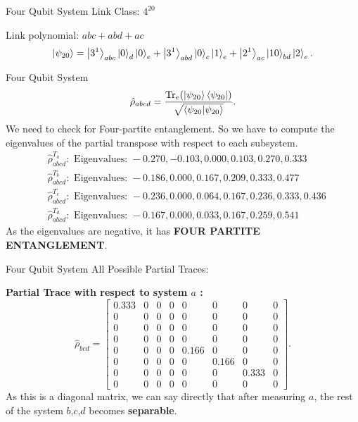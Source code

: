 \documentclass{beamer}
\begin{document}
	
\begin{frame}{Four Qubit System}
Link Class: $4^{20}$

Link polynomial: $abc+ abd + ac$
\begin{equation*}
	\ket{\psi_{20}} = \ket{3^1}_{abc}\ket{0}_{d} \ket{0}_e + \ket{3^1}_{abd} \ket{0}_c \ket{1}_e + \ket{2^1}_{ac} \ket{10}_{bd} \ket{2}_e.
\end{equation*}
\end{frame}

\begin{frame}{Four Qubit System}
\begin{equation*}
	\hat{\rho}_{abcd} = \frac{\Tr_e(\ket{\psi_{20}} \bra{\psi_{20}})}{\sqrt{\bra{\psi_{20}} \ket{\psi_{20}}}}.
\end{equation*}
We need to check for Four-partite entanglement. So we have to compute the eigenvalues of the partial transpose with respect to each subsystem.
\begin{equation*}
\begin{split}
	&\hat{\rho}^{T_a}_{abcd} : \text{ Eigenvalues: } -0.270, -0.103, 0.000, 0.103, 0.270, 0.333 \\
	&\hat{\rho}^{T_b}_{abcd}: \text{ Eigenvalues: } -0.186, 0.000, 0.167, 0.209, 0.333, 0.477 \\
	&\hat{\rho}^{T_c}_{abcd}: \text{ Eigenvalues: } -0.236, 0.000, 0.064, 0.167, 0.236, 0.333, 0.436 \\
	&\hat{\rho}^{T_d}_{abcd}: \text{ Eigenvalues: } -0.167, 0.000, 0.033, 0.167, 0.259, 0.541
\end{split}
\end{equation*}
{As the eigenvalues are negative, it has \textbf{FOUR PARTITE ENTANGLEMENT}.}
\end{frame}

\begin{frame}{Four Qubit System}
All Possible Partial Traces:

\textbf{Partial Trace with respect to system $a$ :}
\begin{equation*}
	\hat{\rho}_{bcd} = \left[\begin{matrix}0.333 & 0 & 0 & 0 & 0 & 0 & 0 & 0\\0 & 0 & 0 & 0 & 0 & 0 & 0 & 0\\0 & 0 & 0 & 0 & 0 & 0 & 0 & 0\\0 & 0 & 0 & 0 & 0 & 0 & 0 & 0\\0 & 0 & 0 & 0 & 0.166 & 0 & 0 & 0\\0 & 0 & 0 & 0 & 0 & 0.166 & 0 & 0\\0 & 0 & 0 & 0 & 0 & 0 & 0.333 & 0\\0 & 0 & 0 & 0 & 0 & 0 & 0 & 0\end{matrix}\right].
\end{equation*}
As this is a diagonal matrix, we can say directly that after measuring $a$, the rest of the system $b$,$c$,$d$ becomes \textbf{separable}.
\end{frame}
\end{document}
